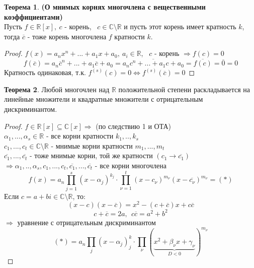 \documentclass[a4paper, 12pt]{article}
\newcommand{\R}{\mathbb R}
\theoremstyle{definition}
\newtheorem*{theorem}{Теорема}
\begin{document}
  \begin{theorem}\textbf{(О мнимых корнях многочлена с вещественными коэффициентами)} \\
    Пусть $f \in \R[x], \ c$ - корень, \ $c \in \mathbb{C}\setminus \R$ и пусть этот корень имеет кратность $k$, тогда $\overline{c}$ - тоже корень многочлена $f$ кратности $k$.     
  \end{theorem} 
  \begin{proof}
    $f(x) = a_nx^n+...+a_1x+a_0, \ a_i \in \R$, \ $c$ - корень $\Longrightarrow f(c) =0$  
    $$f(\overline{c}) = a_n\overline{c}^n+...+a_1\overline{c}+a_0 = \overline{a_nc^n+...+a_1c+a_0} = \overline{f(c)} = \overline{0} = 0$$
    Кратность одинаковая, т.к. $f^{(s)}(c)=0 \Longleftrightarrow f^{(s)}( \overline{c})=0$ 
  \end{proof}
  \begin{theorem}
    Любой многочлен над $\R$ положительной степени раскладывается на линейные множители и квадратные множители с отрицательным дискриминантом.
  \end{theorem}
  \begin{proof}
    $f\in \R[x] \subseteq \mathbb{C}[x] \Longrightarrow $ (по следствию 1 и ОТА) \\
    $\alpha_1,...,\alpha_s \in \R$ - все корни кратности $k_1,..,k_s$\\
    $c_1,...,c_t \in \mathbb{C}\setminus \R$ - мнимые корни кратности $m_1,...,m_t$\\
    $\overline{c_1},...,\overline{c_t}$ - тоже мнимые корни, той же кратности $(c_1 \to \overline{c_1})$\\
    $\Longrightarrow \alpha_1,..,\alpha_s,c_1,...,c_t,\overline{c_1},...,\overline{c_t}$ - все корни многочлена
    $$f(x) = a_n \prod\limits_{j=1}^{s}(x-\alpha_j)^{k_j} \cdot \prod\limits_{\nu=1}^{t}(x-c_{\nu})^{m_\nu}(x-\overline{c_{\nu}})^{m_\nu} = (*)$$
    Если $c=a+bi \in \mathbb{C}\setminus \R$, то:
    $$(x-c)(x-\overline{c}) = x^2 - (c+\overline{c})x + c \overline{c}$$
    $$c+\overline{c} = 2a, \ \ c \overline{c} = a^2 + b^2$$
    $\Longrightarrow $ уравнение с отрицательным дискриминантом    
    $$(*) = a_n \prod\limits_{j}(x-\alpha_j)^k_j \cdot \prod\limits_{\nu}(\underbrace{x^2+\beta_{\nu}x+ \gamma_{\nu}}_{D<0})^{m_\nu} $$    
  \end{proof}
\end{document}
